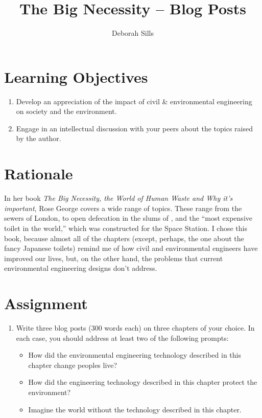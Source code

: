 \documentclass[12pt,letterpaper]{article}
\begin{document}
\setlength{\parindent}{0cm} 


\frenchspacing

\title {\textbf{The Big Necessity -- Blog Posts}}
\author {Deborah Sills}
\maketitle

\section *{Learning Objectives}
\begin{enumerate}
\item Develop an appreciation of the impact of civil \& environmental engineering on society and the environment.
\item Engage in an intellectual discussion with your peers about the topics raised by the author.
\end{enumerate}

\section *{Rationale}
In her book \emph{The Big Necessity, the World of Human Waste and Why it's important}, Rose George covers a wide range of topics.  These range from the sewers of London, to open defecation in the slums of , and the ``most expensive toilet in the world,'' which was constructed for the Space Station.  I chose this book, because almost all of the chapters (except, perhaps, the one about the fancy Japanese toilets) remind me of how civil and environmental engineers have improved our lives, but, on the other hand, the problems that current environmental engineering designs don't address.

\section *{Assignment}
\begin{enumerate}
\item Write three blog posts (300 words each) on three chapters of your choice.  In each case, you should address at least two of the following prompts:

\begin{itemize}
\item How did the environmental engineering technology described in this chapter change peoples live?
\item How did the engineering technology described in this chapter protect the environment?
\item Imagine the world without the technology described in this chapter.
\end{itemize}


\end{enumerate}
\end{document}
